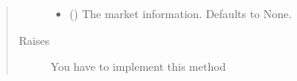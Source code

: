 \documentclass[letterpaper,10pt,english]{sphinxmanual}
\begin{document}
\begin{fulllineitems}
\begin{fulllineitems}
\begin{quote}
\begin{description}
\begin{itemize}
\item {} 
\sphinxAtStartPar
{} (\sphinxstyleliteralemphasis{\sphinxupquote{, }}) \textendash{} The market information. Defaults to None.

\end{itemize}

\item[{Raises}] \leavevmode
\sphinxAtStartPar
{} \textendash{} You have to implement this method

\end{description}\end{quote}

\end{fulllineitems}


\end{fulllineitems}

\end{document}
